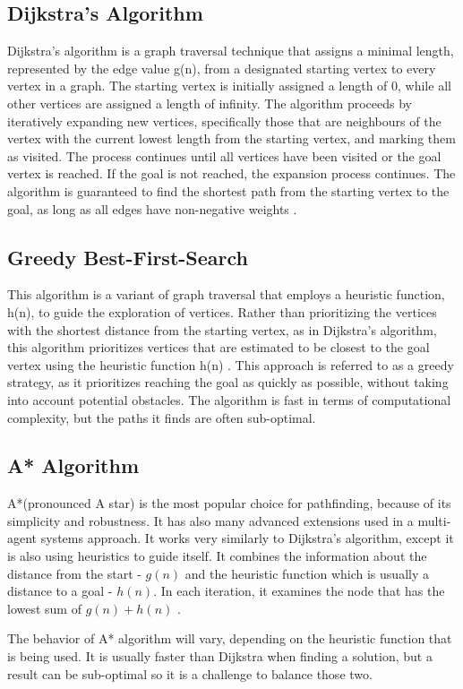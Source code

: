 \subsection{Dijkstra's Algorithm}
Dijkstra's algorithm is a graph traversal technique that assigns a minimal length, represented by the edge value g(n), from a designated starting vertex to every vertex in a graph. The starting vertex is initially assigned a length of 0, while all other vertices are assigned a length of infinity. The algorithm proceeds by iteratively expanding new vertices, specifically those that are neighbours of the vertex with the current lowest length from the starting vertex, and marking them as visited. The process continues until all vertices have been visited or the goal vertex is reached. If the goal is not reached, the expansion process continues. The algorithm is guaranteed to find the shortest path from the starting vertex to the goal, as long as all edges have non-negative weights \cite{basic_algorithms, basic_2}.

\subsection{Greedy Best-First-Search}
This algorithm is a variant of graph traversal that employs a heuristic function, h(n), to guide the exploration of vertices. Rather than prioritizing the vertices with the shortest distance from the starting vertex, as in Dijkstra's algorithm, this algorithm prioritizes vertices that are estimated to be closest to the goal vertex using the heuristic function h(n) 
  \cite{a_star_dijkstra}. This approach is referred to as a greedy strategy, as it prioritizes reaching the goal as quickly as possible, without taking into account potential obstacles. The algorithm is fast in terms of computational complexity, but the paths it finds are often sub-optimal.

\subsection{A* Algorithm}
A*(pronounced A star) is the most popular choice for pathfinding, because of its simplicity and robustness. It has also many advanced extensions used in a multi-agent systems approach. It works very similarly to Dijkstra's algorithm, except it is also using heuristics to guide itself. It combines the information about the distance from the start - \(g(n)\) and the heuristic function which is usually a distance to a goal - \(h(n)\). In each iteration, it examines the node that has the lowest sum of \(g(n) + h(n)\) \cite{basic_2}.

The behavior of A* algorithm will vary, depending on the heuristic function that is being used. It is usually faster than Dijkstra when finding a solution, but a result can be sub-optimal so it is a challenge to balance those two.
